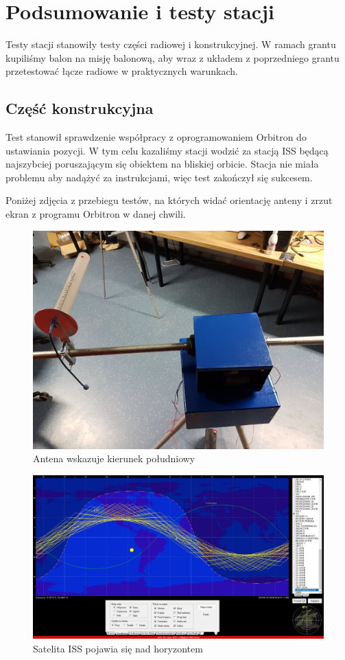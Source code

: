 \section{Podsumowanie i testy stacji}

Testy stacji stanowiły testy części radiowej i konstrukcyjnej. W ramach grantu kupiliśmy balon na misję balonową, aby wraz z układem z poprzedniego grantu przetestować łącze radiowe w praktycznych warunkach.

\subsection{Część konstrukcyjna}

Test stanowił sprawdzenie współpracy z oprogramowaniem Orbitron do ustawiania pozycji. W tym celu kazaliśmy stacji wodzić za stacją ISS będącą najszybciej poruszającym się obiektem na bliskiej orbicie. Stacja nie miała problemu aby nadążyć za instrukcjami, więc test zakończył się sukcesem.



Poniżej zdjęcia z przebiegu testów, na których widać orientację anteny i zrzut ekran z programu Orbitron w danej chwili.

\begin{figure}[h]
	\centering
		\includegraphics[width=0.7 \textwidth]{testy/antenaS}
	\caption{Antena wskazuje kierunek południowy}	
	\label{fig:antenaS}
\end{figure}

\begin{figure}[h]
	\centering
		\includegraphics[width=0.7 \textwidth]{testy/pojawia}
	\caption{Satelita ISS pojawia się nad horyzontem}	
	\label{fig:pojawia}
\end{figure}

